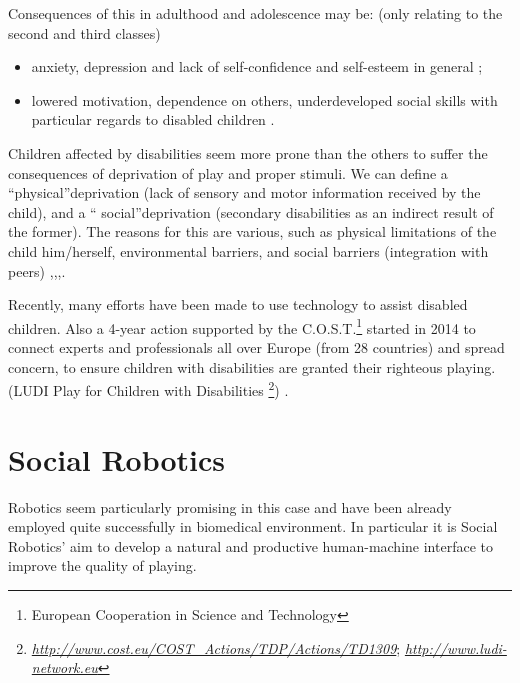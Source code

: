 \documentclass[a4paper,twoside]{book}
\begin{document}
Consequences of this in adulthood and adolescence may be: (only relating to the second and third classes)
\begin{itemize}
\item  anxiety, depression and lack of self-confidence and self-esteem in general \cite{art4};
\item lowered motivation, dependence on others, underdeveloped social skills with particular regards to disabled children \cite{art9}.
\end{itemize}

Children affected by disabilities seem more prone than the others to suffer the consequences of deprivation of play and proper stimuli. We can define a  \textquotedblleft physical\textquotedblright deprivation (lack of sensory and motor information received by the child), and a \textquotedblleft
 social\textquotedblright deprivation (secondary disabilities as an indirect result of the former). The reasons for this are various, such as physical limitations of the child him/herself, environmental barriers, and social barriers (integration with peers) \cite{art2},\cite{art4},\cite{art8},\cite{art9}.

Recently, many efforts have been made to use technology to assist disabled children. Also a 4-year action supported by the C.O.S.T.\footnote{European Cooperation in Science and Technology} started in 2014 to connect experts and professionals all over Europe (from 28 countries) and spread concern, to ensure children with disabilities are granted their righteous playing. (LUDI \textemdash Play for Children with Disabilities \footnote{\textit\underline{http://www.cost.eu/COST\_Actions/TDP/Actions/TD1309}; \textit\underline{http://www.ludi-network.eu}}) \cite{art3}.

\section{Social Robotics}
Robotics seem particularly promising in this case and have been already employed quite successfully in biomedical environment. In particular it is Social Robotics' aim to develop a natural and productive human-machine interface to improve the quality of playing.
 
\end{document}
